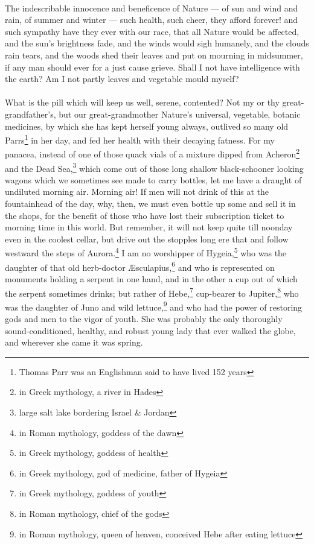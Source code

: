 \documentclass[letterpaper,12pt]{article}
\begin{document}
\paragraph{}
The indescribable innocence and beneficence of Nature --- of sun and wind and
rain, of summer and winter --- such health, such cheer, they afford forever! and
such sympathy have they ever with our race, that all Nature would be affected,
and the sun's brightness fade, and the winds would sigh humanely, and the clouds
rain tears, and the woods shed their leaves and put on mourning in midsummer, if
any man should ever for a just cause grieve. Shall I not have intelligence with
the earth? Am I not partly leaves and vegetable mould myself?

\paragraph{}
What is the pill which will keep us well, serene, contented? Not my or thy
great-grandfather's, but our great-grandmother Nature's universal, vegetable,
botanic medicines, by which she has kept herself young always, outlived so many
old Parrs\footnote{Thomas Parr was an Englishman said to have lived 152 years}
in her day, and fed her health with their decaying fatness. For my panacea,
instead of one of those quack vials of a mixture dipped from Acheron\footnote{in
    Greek mythology, a river in Hades} and the Dead Sea,\footnote{large salt
    lake bordering Israel \& Jordan} which come out of those long shallow
black-schooner looking wagons which we sometimes see made to carry bottles, let
me have a draught of undiluted morning air. Morning air! If men will not drink
of this at the fountainhead of the day, why, then, we must even bottle up some
and sell it in the shops, for the benefit of those who have lost their
subscription ticket to morning time in this world. But remember, it will not
keep quite till noonday even in the coolest cellar, but drive out the stopples
long ere that and follow westward the steps of Aurora.\footnote{in Roman
    mythology, goddess of the dawn} I am no worshipper of Hygeia,\footnote{in
    Greek mythology, goddess of health} who was the daughter of that old
herb-doctor \AE{}sculapius,\footnote{in Greek mythology, god of medicine, father
    of Hygeia} and who is represented on monuments holding a serpent in one
hand, and in the other a cup out of which the serpent sometimes drinks; but
rather of Hebe,\footnote{in Greek mythology, goddess of youth} cup-bearer to
Jupiter,\footnote{in Roman mythology, chief of the gods} who was the daughter of
Juno and wild lettuce,\footnote{in Roman mythology, queen of heaven, conceived
    Hebe after eating lettuce} and who had the power of restoring gods and men
to the vigor of youth. She was probably the only thoroughly sound-conditioned,
healthy, and robust young lady that ever walked the globe, and wherever she came
it was spring.
\end{document}
